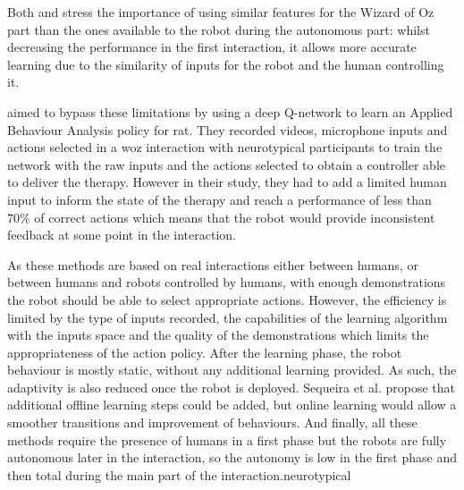     Both \citet{knox2014learning} and \citet{sequeira2016discovering} stress the importance of using similar features for the Wizard of Oz part than the ones available to the robot during the autonomous part: whilst decreasing the performance in the first interaction, it allows more accurate learning due to the similarity of inputs for the robot and the human controlling it.
        
    \cite{clark2018deep} aimed to bypass these limitations by using a deep Q-network \citep{mnih2015human} to learn an Applied Behaviour Analysis policy for \gls{rat}. They recorded videos, microphone inputs and actions selected in a \gls{woz} interaction with neurotypical participants to train the network with the raw inputs and the actions selected to obtain a controller able to deliver the therapy. However in their study, they had to add a limited human input to inform the state of the therapy and reach a performance of less than 70\% of correct actions which means that the robot would provide inconsistent feedback at some point in the interaction. 
     
    As these methods are based on real interactions either between humans, or between humans and robots controlled by humans, with enough demonstrations the robot should be able to select appropriate actions. However, the efficiency is limited by the type of inputs recorded, the capabilities of the learning algorithm with the inputs space and the quality of the demonstrations which limits the appropriateness of the action policy. After the learning phase, the robot behaviour is  mostly static, without any additional learning provided. As such, the adaptivity is also reduced once the robot is deployed. Sequeira et al. propose that additional offline learning steps could be added, but online learning would allow a smoother transitions and improvement of behaviours.
    And finally, all these methods require the presence of humans in a first phase but the robots are fully autonomous later in the interaction, so the autonomy is low in the first phase and then total during the main part of the interaction.neurotypical
    
